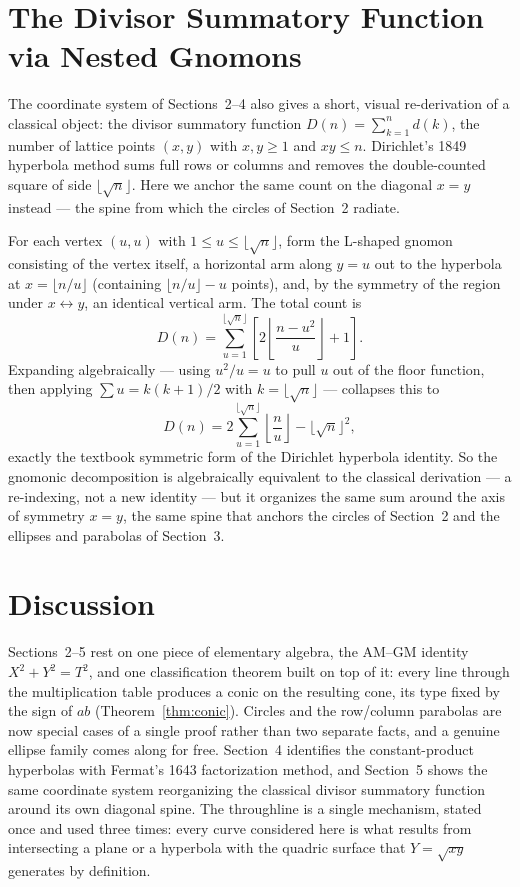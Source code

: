 \documentclass[11pt]{amsart}
\theoremstyle{remark}
\begin{document}
\section{The Divisor Summatory Function via Nested Gnomons}

The coordinate system of Sections~2--4 also gives a short, visual re-derivation of a classical object: the divisor summatory function $D(n)=\sum_{k=1}^nd(k)$, the number of lattice points $(x,y)$ with $x,y\ge1$ and $xy\le n$. Dirichlet's 1849 hyperbola method sums full rows or columns and removes the double-counted square of side $\lfloor\sqrt n\rfloor$. Here we anchor the same count on the diagonal $x=y$ instead --- the spine from which the circles of Section~2 radiate.

For each vertex $(u,u)$ with $1\le u\le\lfloor\sqrt n\rfloor$, form the L-shaped gnomon consisting of the vertex itself, a horizontal arm along $y=u$ out to the hyperbola at $x=\lfloor n/u\rfloor$ (containing $\lfloor n/u\rfloor-u$ points), and, by the symmetry of the region under $x\leftrightarrow y$, an identical vertical arm. The total count is
\begin{equation}
D(n)=\sum_{u=1}^{\lfloor\sqrt n\rfloor}\left[2\left\lfloor\frac{n-u^2}u\right\rfloor+1\right]. \tag{5.1}
\end{equation}
Expanding algebraically --- using $u^2/u=u$ to pull $u$ out of the floor function, then applying $\sum u=k(k+1)/2$ with $k=\lfloor\sqrt n\rfloor$ --- collapses this to
\begin{equation}
D(n)=2\sum_{u=1}^{\lfloor\sqrt n\rfloor}\left\lfloor\frac nu\right\rfloor-\lfloor\sqrt n\rfloor^2, \tag{5.2}
\end{equation}
exactly the textbook symmetric form of the Dirichlet hyperbola identity. So the gnomonic decomposition is algebraically equivalent to the classical derivation --- a re-indexing, not a new identity --- but it organizes the same sum around the axis of symmetry $x=y$, the same spine that anchors the circles of Section~2 and the ellipses and parabolas of Section~3.

\section{Discussion}

Sections~2--5 rest on one piece of elementary algebra, the AM--GM identity $X^2+Y^2=T^2$, and one classification theorem built on top of it: every line through the multiplication table produces a conic on the resulting cone, its type fixed by the sign of $ab$ (Theorem~\ref{thm:conic}). Circles and the row/column parabolas are now special cases of a single proof rather than two separate facts, and a genuine ellipse family comes along for free. Section~4 identifies the constant-product hyperbolas with Fermat's 1643 factorization method, and Section~5 shows the same coordinate system reorganizing the classical divisor summatory function around its own diagonal spine. The throughline is a single mechanism, stated once and used three times: every curve considered here is what results from intersecting a plane or a hyperbola with the quadric surface that $Y=\sqrt{xy}$ generates by definition.
\end{document}
